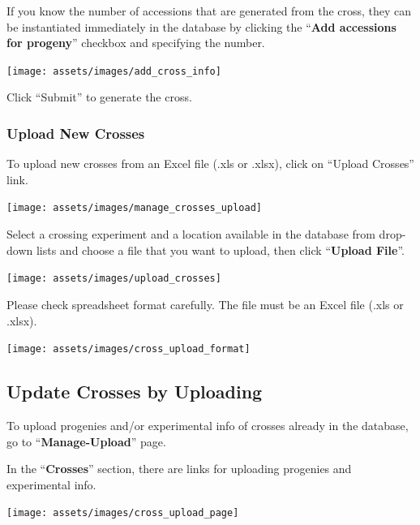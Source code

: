 \documentclass[
  12pt,
]{book}
\begin{document}
If you know the number of accessions that are generated from the cross, they can be instantiated immediately in the database by clicking the ``\textbf{Add accessions for progeny}'' checkbox and specifying the number.

\begin{center}\texttt{[image: assets/images/add\_cross\_info]} \end{center}

Click ``Submit'' to generate the cross.

\hypertarget{upload-new-crosses}{%
\subsubsection*{Upload New Crosses}\label{upload-new-crosses}}


To upload new crosses from an Excel file (.xls or .xlsx), click on ``Upload Crosses'' link.

\begin{center}\texttt{[image: assets/images/manage\_crosses\_upload]} \end{center}

Select a crossing experiment and a location available in the database from drop-down lists and choose a file that you want to upload, then click ``\textbf{Upload File}''.

\begin{center}\texttt{[image: assets/images/upload\_crosses]} \end{center}

Please check spreadsheet format carefully. The file must be an Excel file (.xls or .xlsx).

\begin{center}\texttt{[image: assets/images/cross\_upload\_format]} \end{center}

\hypertarget{update-crosses-by-uploading}{%
\subsection{Update Crosses by Uploading}\label{update-crosses-by-uploading}}

To upload progenies and/or experimental info of crosses already in the database, go to ``\textbf{Manage-Upload}'' page.

In the ``\textbf{Crosses}'' section, there are links for uploading progenies and experimental info.

\begin{center}\texttt{[image: assets/images/cross\_upload\_page]} \end{center}
\end{document}
